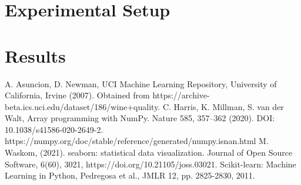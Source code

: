 \documentclass[titlepage]{article}
\begin{document}
	\section*{Experimental Setup}
	\section*{Results}
	
	
\begin{thebibliography}{9}
	 A. Asuncion, D. Newman, UCI Machine Learning Repository, University of California, Irvine  (2007).  Obtained from https://archive-beta.ics.uci.edu/dataset/186/wine+quality. 
	 C. Harris, K. Millman, S. van der Walt,  Array programming with NumPy. Nature 585, 357–362 (2020). DOI: 10.1038/s41586-020-2649-2.  https://numpy.org/doc/stable/reference/generated/numpy.isnan.html
	 M. Waskom, (2021). seaborn: statistical data visualization. Journal of Open Source Software, 6(60), 3021, https://doi.org/10.21105/joss.03021.
	Scikit-learn: Machine Learning in Python, Pedregosa et al., JMLR 12, pp. 2825-2830, 2011. 
\end{thebibliography}
\end{document}
